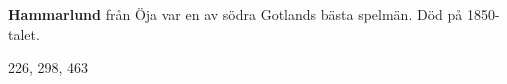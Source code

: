 \textbf{Hammarlund} från Öja var en av södra Gotlands bästa spelmän. Död på 1850-talet.

226, 298, 463 
